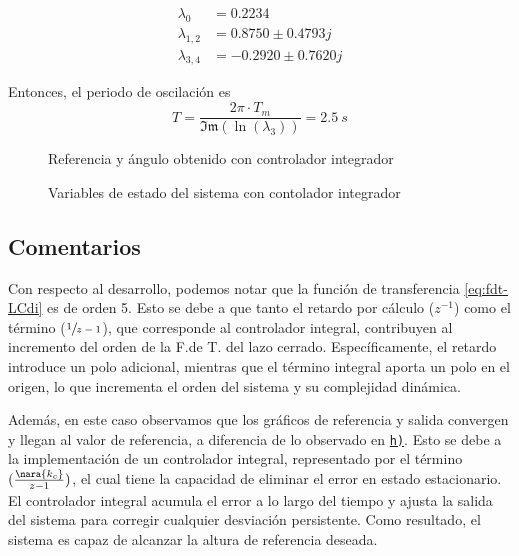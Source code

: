 \begin{align*}
  \lambda_{0} &= 0.2234\\
  \lambda_{1,2} &= 0.8750 \pm 0.4793j\\
  \lambda_{3,4} &= -0.2920 \pm 0.7620j
\end{align*}

Entonces, el periodo de oscilación es
\begin{equation}
    T = \frac{2\pi \cdot T_{m}}{\mathfrak{Im}(\ln(\lambda_{3}))} = 2.5\ \unit{s} 
\end{equation}

\begin{figure}[h]
    \centering
    
    \caption{Referencia y ángulo obtenido con controlador integrador}\label{fig:psi-int-disc-marge}
\end{figure}

\begin{figure}[h]
  \centering
  
  \caption{Variables de estado del sistema con contolador integrador}\label{fig:estado-int-disc-marge}
\end{figure}
  
\FloatBarrier
\subsection{Comentarios}

Con respecto al desarrollo, podemos notar que la función de transferencia 
\eqref{eq:fdt-LCdi} es de orden 5. Esto se debe a que tanto el retardo por 
cálculo ($z^{-1}$) como el término ($\sfrac{1}{z-1}$), que corresponde al 
controlador integral, contribuyen al incremento del orden de la F.de T. del 
lazo cerrado. Específicamente, el retardo introduce un polo adicional, mientras 
que el término integral aporta un polo en el origen, lo que incrementa el orden 
del sistema y su complejidad dinámica.

Además, en este caso observamos que los gráficos de referencia y salida 
convergen y llegan al valor de referencia, a diferencia de lo observado en 
\hyperref[pregunta-h]{\texttt{h)}}. Esto se debe a la implementación de un 
controlador integral, representado por el término $(\frac{\nara{k_c}}{z-1}
)$, el cual tiene la capacidad de eliminar el error en estado 
estacionario. El controlador integral acumula el error a lo largo del tiempo y 
ajusta la salida del sistema para corregir cualquier desviación persistente. 
Como resultado, el sistema es capaz de alcanzar la altura de referencia deseada.

